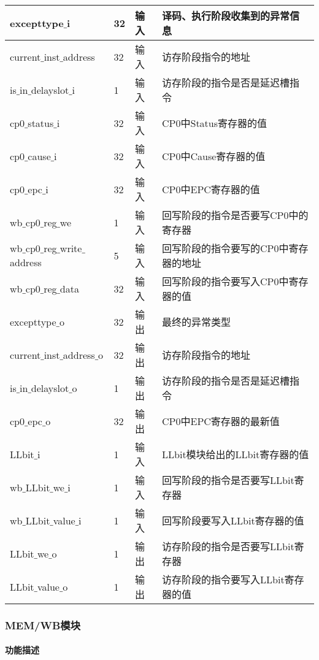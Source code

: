 \begin{table}[H]
	\centering
	\begin{tabular}{|l|l|l|l|}
		\hline
		excepttype$\_$i & 32 & 输入 & 译码、执行阶段收集到的异常信息 \\
		\hline
		current$\_$inst$\_$address & 32 & 输入 & 访存阶段指令的地址 \\
		\hline
		is$\_$in$\_$delayslot$\_$i & 1 & 输入 & 访存阶段的指令是否是延迟槽指令 \\
		\hline
		cp0$\_$status$\_$i & 32 & 输入 & CP0中Status寄存器的值 \\
		\hline
		cp0$\_$cause$\_$i & 32 & 输入 & CP0中Cause寄存器的值 \\
		\hline
		cp0$\_$epc$\_$i & 32 & 输入 & CP0中EPC寄存器的值 \\
		\hline
		wb$\_$cp0$\_$reg$\_$we & 1 & 输入 & 回写阶段的指令是否要写CP0中的寄存器 \\
		\hline
		wb$\_$cp0$\_$reg$\_$write$\_$address & 5 & 输入 & 回写阶段的指令要写的CP0中寄存器的地址 \\
		\hline
		wb$\_$cp0$\_$reg$\_$data & 32 & 输入 & 回写阶段的指令要写入CP0中寄存器的值 \\
		\hline
		excepttype$\_$o & 32 & 输出 & 最终的异常类型 \\
		\hline
		current$\_$inst$\_$address$\_$o & 32 & 输出 & 访存阶段指令的地址 \\
		\hline
		is$\_$in$\_$delayslot$\_$o & 1 & 输出 & 访存阶段的指令是否是延迟槽指令 \\
		\hline
		cp0$\_$epc$\_$o & 32 & 输出 & CP0中EPC寄存器的最新值 \\
		\hline
		LLbit$\_$i & 1 & 输入 & LLbit模块给出的LLbit寄存器的值 \\
		\hline
		wb$\_$LLbit$\_$we$\_$i & 1 & 输入 & 回写阶段的指令是否要写LLbit寄存器 \\
		\hline
		wb$\_$LLbit$\_$value$\_$i & 1 & 输入 & 回写阶段要写入LLbit寄存器的值 \\
		\hline
		LLbit$\_$we$\_$o & 1 & 输出 & 访存阶段的指令是否要写LLbit寄存器 \\
		\hline
		LLbit$\_$value$\_$o & 1 & 输出 & 访存阶段的指令要写入LLbit寄存器的值 \\
		\hline
	\end{tabular}
\end{table}
\subsubsection{MEM/WB模块}
\paragraph{功能描述}
\quad

